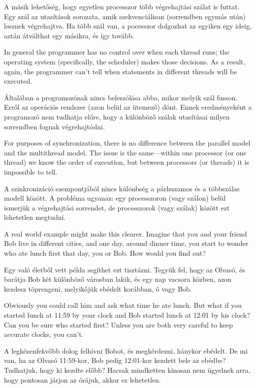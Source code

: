 \documentclass{book}
\begin{document}
A másik lehetőség, hogy egyetlen processzor több végrehajtási
szálat is futtat. Egy szál az utasítások sorozata, amik
szekvenciálisan (sorrendben egymás után) lesznek végrehajtva.
Ha több szál van, a pocesszor dolgozhat az egyiken egy ideig, aztán
átválthat egy másikra, és így tovább.

In general the programmer has no control over when each thread runs;
the operating system (specifically, the scheduler) makes those
decisions.  As a result, again, the programmer can't tell when
statements in different threads will be executed.

Általában a programozónak nincs beleszólása abba, mikor melyik
szál fusson. Erről az operációs rendszer (azon belül az ütemező)
dönt. Ennek eredményeként a programozó nem tudhatja előre,
hogy a különböző szálak utasításai milyen sorrendben fognak végrehajtódni.

For purposes of synchronization, there is no difference between the
parallel model and the multithread model.  The issue is the
same---within one processor (or one thread) we know the order of
execution, but between processors (or threads) it is impossible to
tell.

A szinkronizáció szempontjából nincs különbség a párhuzamos és a
többszálas modell között. A probléma ugyanaz: egy processzoron (vagy
szálon) belül ismerjük a végrehajtási sorrendet, de processzorok
(vagy szálak) között ezt lehetetlen megtudni.

A real world example might make this clearer.  Imagine that you and
your friend Bob live in different cities, and one day, around dinner
time, you start to wonder who ate lunch first that day, you or Bob.
How would you find out?

Egy való életből vett példa segíthet ezt tisztázni. Tegyük fel,
hogy az Olvasó, és barátja Bob két különböző városban lakik, és
egy nap vacsora közben, azon kezdesz töprengeni, melyikőjük ebédelt
korábban, ő vagy Bob.

Obviously you could call him and ask what time he ate lunch.  But what
if you started lunch at 11:59 by your clock and Bob started lunch at
12:01 by his clock?  Can you be sure who started first?  Unless you
are both very careful to keep accurate clocks, you can't.

A legkézenfekvőbb dolog felhívni Bobot, és megkérdezni, hánykor
ebédelt. De mi van, ha az Olvasó 11:59-kor, Bob pedig 12:01-kor
kezdett bele az ebédbe? Tudhatjuk, hogy ki kezdte előbb? Hacsak
mindketten kínosan nem ügyelnek arra, hogy pontosan járjon az órájuk,
akkor ez lehetetlen.
\end{document}
